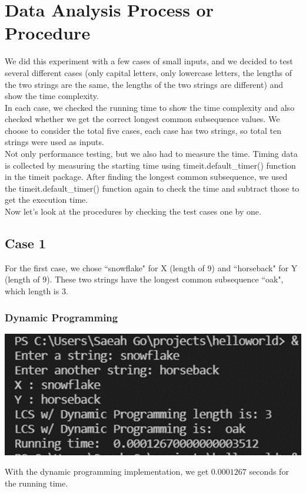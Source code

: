 \documentclass{article}
\begin{document}
\section{\textbf{Data Analysis Process or Procedure}}
\indent \indent We did this experiment with a few cases of small inputs, and we decided to test several different cases (only capital letters, only lowercase letters, the lengths of the two strings are the same, the lengths of the two strings are different) and show the time complexity. \\
\indent In each case, we checked the running time to show the time complexity and also checked whether we get the correct longest common subsequence values. We choose to consider the total five cases, each case has two strings, so total ten strings were used as inputs. \\
\indent Not only performance testing, but we also had to measure the time. Timing data is collected by measuring the starting time using timeit.default\_timer() function in the timeit package. After finding the longest common subsequence, we used the timeit.default\_timer() function again to check the time and subtract those to get the execution time. \\
\indent Now let's look at the procedures by checking the test cases one by one.

\subsection{\textbf{Case 1}}
For the first case, we chose ``snowflake" for X (length of 9) and ``horseback" for Y (length of 9). These two strings have the longest common subsequence ``oak", which length is 3.
\subsubsection{Dynamic Programming}
\begin{center}
\includegraphics[scale = 0.7]{case1 DP.png} \\
\end{center}
With the dynamic programming implementation, we get $0.0001267$ seconds for the running time.
\end{document}
